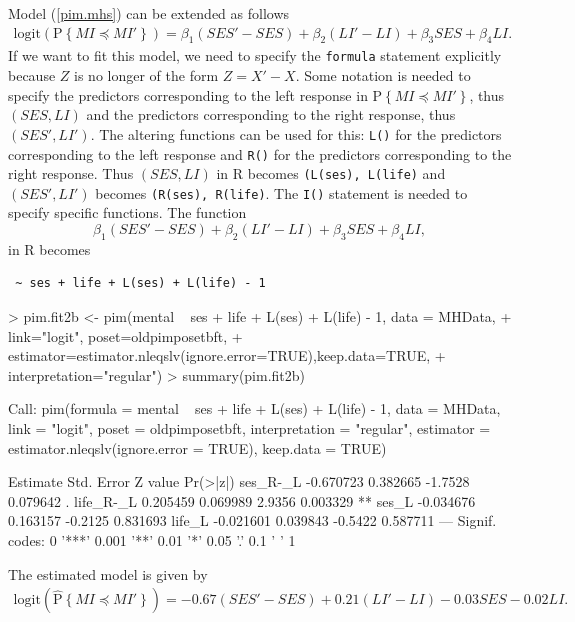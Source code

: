 \documentclass[12pt]{article}
\newcommand{\prob}[1]{\text{P}\left\{#1\right\}}
\newcommand{\hatprob}[1]{\hat{\text{P}}\left\{#1\right\}}
\newcommand{\leqs}{\preccurlyeq}
\begin{document}
Model (\ref{pim.mhs}) can be extended as follows
\begin{eqnarray*}
\text{logit}\left(\prob{MI \leqs MI'} \right) = \beta_1 (SES' - SES) + \beta_2 (LI' - LI) + \beta_3 SES + \beta_4 LI. 
\end{eqnarray*}
If we want to fit this model, we need to specify the \texttt{formula} statement explicitly because $Z$ is no longer of the form $Z = X' - X$. Some notation is needed to specify the predictors corresponding to the left response in $\prob{MI \leqs MI'}$, thus $(SES,LI)$ and the predictors corresponding to the right response, thus $(SES', LI')$. The altering functions can be used for this: \texttt{L()} for the predictors corresponding to the left response and \texttt{R()} for the predictors corresponding to the right response. Thus $(SES, LI)$ in R becomes \texttt{(L(ses), L(life)} and $(SES',LI')$ becomes \texttt{(R(ses), R(life)}. The \texttt{I()} statement is needed to specify specific functions. The function
\[
\beta_1 (SES' - SES) + \beta_2 (LI' - LI) + \beta_3 SES + \beta_4 LI,
\]
in R becomes
\begin{center}
\begin{verbatim}
 ~ ses + life + L(ses) + L(life) - 1
\end{verbatim}
\end{center}
\begin{Schunk}
\begin{Sinput}
> pim.fit2b <- pim(mental ~ ses + life + L(ses) + L(life) - 1, data = MHData,  
+   link="logit", poset=oldpimposetbft,  
+   estimator=estimator.nleqslv(ignore.error=TRUE),keep.data=TRUE, 
+   interpretation="regular")
> summary(pim.fit2b)
\end{Sinput}
\begin{Soutput}
Call:
pim(formula = mental ~ ses + life + L(ses) + L(life) - 1, data = MHData, 
    link = "logit", poset = oldpimposetbft, interpretation = "regular", 
    estimator = estimator.nleqslv(ignore.error = TRUE), keep.data = TRUE)

           Estimate Std. Error Z value Pr(>|z|)   
ses_R-_L  -0.670723   0.382665 -1.7528 0.079642 . 
life_R-_L  0.205459   0.069989  2.9356 0.003329 **
ses_L     -0.034676   0.163157 -0.2125 0.831693   
life_L    -0.021601   0.039843 -0.5422 0.587711   
---
Signif. codes:  0 '***' 0.001 '**' 0.01 '*' 0.05 '.' 0.1 ' ' 1 
\end{Soutput}
\end{Schunk}
The estimated model is given by
\begin{eqnarray*}
\text{logit}\left(\hatprob{MI \leqs MI'} \right) = -0.67 (SES' - SES) + 0.21 (LI' - LI)  -0.03 SES  -0.02 LI. 
\end{eqnarray*}
\end{document}
